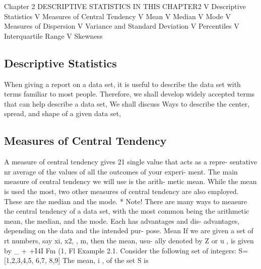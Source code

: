 
Chapter 2
DESCRIPTIVE STATISTICS
IN THIS CHAPTER2
V Descriptive Statistics
V Measures of Central Tendency
V Mean
V Median
V Mode
V Measures of Dispersion
V Variance and Standard Deviation
V Percentiles
V Interquartile Range
V Skewness

\subsection*{Descriptive Statistics}
When giving a report on a data set, it is useful to describe the data set
with terms familiar to most people. Therefore, we shall develop widely
accepted terms that can help describe a data set, We shall discuss Ways
to describe the center, spread, and shape of a given data set,

\subsection*{Measures of Central Tendency}

A measure of central tendency gives 21 single value that acts as a repre-
sentative nr average of the values of all the outcomes of your experi-
ment. The main measure of central tendency we will use is the arith-
metic mean. While the mean is used the most, two other measures of
central tendency are also employed. These are the median and the mode.
* Note!
There are many ways to measure the central tendency of a
data set, with the most common being the arithmetic mean,
the median, and the mode. Each has advantages and dis-
advantages, depending on the data and the intended pur-
pose.
Mean
If we are given a set of rt numbers, say xi, x2,  , m, then the mean, usu-
ally denoted by Z or u , is given by
_ + +I4I
Fm (1,
Fl
Example 2.1. Consider the following set of integers:
S= [1,2,3,4,5, 6,7, 8,9]
The mean, i , of the set S is



